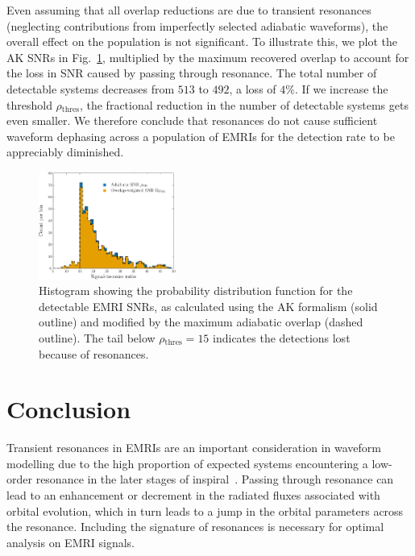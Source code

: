 \documentclass[aps,prd,amsfonts,amssymb,amsmath,nofootinbib,showpacs,superscriptaddress,twocolumn,floatfix]{revtex4-1}
\newcommand{\figref}[1]{Fig.~\ref{fig:#1}}
\newcommand{\sub}[1]{\ensuremath{_\mathrm{#1}}}
\begin{document}
Even assuming that all overlap reductions are due to transient resonances (neglecting contributions from imperfectly selected adiabatic waveforms), the overall effect on the population is not significant. To illustrate this, we plot the AK SNRs in \figref{pop-SNR-dist}, multiplied by the maximum recovered overlap to account for the loss in SNR caused by passing through resonance. The total number of detectable systems decreases from $513$ to $492$, a loss of $4\%$. If we increase the threshold $\rho\sub{thres}$, the fractional reduction in the number of detectable systems gets even smaller. We therefore conclude that resonances do not cause sufficient waveform dephasing across a population of EMRIs for the detection rate to be appreciably diminished.

\begin{figure}
\centering
\includegraphics[width=0.4\textwidth]{Fig_res_pop_SNR_overlap}
\caption{\label{fig:pop-SNR-dist}Histogram showing the probability distribution function for the detectable EMRI SNRs, as calculated using the AK formalism (solid outline) and modified by the maximum adiabatic overlap (dashed outline). The tail below $\rho\sub{thres} = 15$ indicates the detections lost because of resonances.}
\end{figure}

\section{Conclusion}
\label{sec:conclusion}

Transient resonances in EMRIs are an important consideration in waveform modelling due to the high proportion of expected systems encountering a low-order resonance in the later stages of inspiral~\cite{Ruangsri2014}. Passing through resonance can lead to an enhancement or decrement in the radiated fluxes associated with orbital evolution, which in turn leads to a jump in the orbital parameters across the resonance. Including the signature of resonances is necessary for optimal analysis on EMRI signals. 
\end{document}
